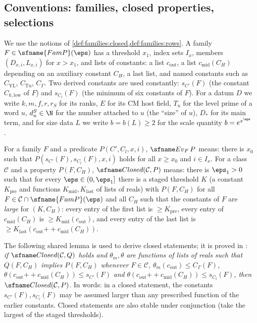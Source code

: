 \subsection{Conventions: families, closed properties, selections}\label{sec:pf:thmS:conv}

We use the notions of \cref{def:families:closed,def:families:rows}. A family $F\in\sfname{FamP}(\eps)$ has a threshold
$x_1$, index sets $I_x$, members $(D_{x,i},L_{x,i})$ for $x>x_1$, and lists of constants: a list $c_{\mathrm{out}}$,
a list $c_{\mathrm{mid}}(C_H)$ depending on an auxiliary constant $C_H$, a last list, and named constants such as
$C_{\mathrm{YL}}$, $C_{\mathrm{Tu}}$, $C_\Gamma$. Two derived constants are used constantly:
$s_{C'}(F)$ (the constant $C_{k,\mathrm{low}}$ of $F$) and $s_{C_l}(F)$ (the minimum of six constants of $F$).
For a datum $D$ we write $k,m,f,r,r_S$ for its ranks, $E$ for its CM host field, $T_u$ for the level prime of a word
$u$, $d^S_u\in\N$ for the number attached to $u$ (the ``size'' of $u$), $D_*$ for its main term, and for size data
$L$ we write $b=b(L)\ge2$ for the scale quantity $b=e^{x^\eps}$.

\begin{definition}\label{pf:thmS:closed}
For a family $F$ and a predicate $P(C',C_l,x,i)$, $\thmSEv_F\,P$ means: there is $x_0$ such that
$P(s_{C'}(F),s_{C_l}(F),x,i)$ holds for all $x\ge x_0$ and $i\in I_x$. For a class $\mathcal C$ and a property
$P(F,C_H)$, $\thmSClosed(\mathcal C,P)$ means: there is $\eps_1>0$ such that for every $\eps\in(0,\eps_1]$ there is a
staged threshold $K$ (a constant $K_{\mathrm{pre}}$ and functions $K_{\mathrm{mid}},K_{\mathrm{last}}$ of lists of
reals) with $P(F,C_H)$ for all $F\in\mathcal C\cap\sfname{FamP}(\eps)$ and all $C_H$ such that the constants of
$F$ are \emph{large} for $(K,C_H)$: every entry of the first list is $\ge K_{\mathrm{pre}}$, every entry of
$c_{\mathrm{mid}}(C_H)$ is $\ge K_{\mathrm{mid}}(c_{\mathrm{out}})$, and every entry of the last list is
$\ge K_{\mathrm{last}}(c_{\mathrm{out}}\mathbin{+\!\!+}c_{\mathrm{mid}}(C_H))$.
\end{definition}

The following shared lemma is used to derive closed statements; it is proved in
: \emph{if $\thmSClosed(\mathcal C,Q)$ holds and $\theta_m,\theta$ are
functions of lists of reals such that $Q(F,C_H)$ implies $P(F,C_H)$ whenever $F\in\mathcal C$,
$\theta_m(c_{\mathrm{out}})\le C_\Gamma(F)$, $\theta(c_{\mathrm{out}}\mathbin{+\!\!+}c_{\mathrm{mid}}(C_H))\le
s_{C'}(F)$ and $\theta(c_{\mathrm{out}}\mathbin{+\!\!+}c_{\mathrm{mid}}(C_H))\le s_{C_l}(F)$, then
$\thmSClosed(\mathcal C,P)$.} In words: in a closed statement, the constants $s_{C'}(F),s_{C_l}(F)$ may be assumed
larger than any prescribed function of the earlier constants. Closed statements are also stable under
conjunction (take the largest of the staged thresholds).

